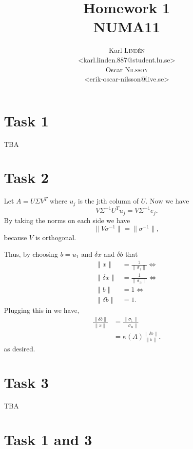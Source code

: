 \documentclass[a4paper,12pt]{article}
\begin{document}
\title{Homework 1 \\ NUMA11}
\author{
  Karl \textsc{Lind\'{e}n} \\
  <karl.linden.887@student.lu.se> \\
  Oscar \textsc{Nilsson} \\
  <erik-oscar-nilsson@live.se>
}

\maketitle
\thispagestyle{empty}

\newpage

\section*{Task 1}
TBA

\section*{Task 2}
Let \( A = U \Sigma V^T \) where \(u_j\) is the j:th column of \( 
U\). Now we have 
\[ V \Sigma^{-1}U^T u_j = V \Sigma^{-1} e_j. \]
By taking the norms on each side we have
\[ \|V \sigma^{-1} \| = \| \sigma^{-1} \|, \]
because \( V \) is orthogonal.

Thus, by choosing \( b = u_1\) and \( \delta x\) and \(\delta b \) 
that 
\begin{align*}
\| x \| &= \frac{1}{\| \sigma_1 \| } \Leftrightarrow\\
\|\delta x\| &= \frac{1}{\| \sigma_n \| } \Leftrightarrow\\
\|b\| &= 1 \Leftrightarrow\\
\|\delta b\| &= 1.
\end{align*}
Plugging this in we have,
\begin{align*}
\frac{\|\delta b\|}{\| x\|} &= \frac{\|\sigma_1\|}{\|\sigma_n\|}\\
&= \kappa(A) \frac{\| \delta b\|}{\|b\|}.
\end{align*}
as desired.

\section*{Task 3}
TBA

\appendix
\section*{Task 1 and 3}

\end{document}

